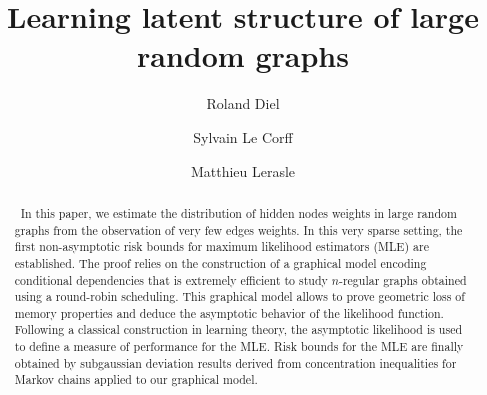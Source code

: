 


\title{Learning latent structure of large random graphs}
\date{}

\author{Roland Diel\footnotemark[1] \and Sylvain Le {C}orff\footnotemark[2] \and Matthieu Lerasle\footnotemark[2]}



\maketitle

\begin{abstract}
~In this paper, we estimate the distribution of hidden nodes weights in large random graphs from the observation of very few edges weights. In this very sparse setting, the first non-asymptotic risk bounds for maximum likelihood estimators (MLE) are established. The proof relies on the construction of a graphical model encoding conditional dependencies that is extremely efficient to study $n$-regular graphs obtained using a round-robin scheduling. This graphical model allows to prove geometric loss of memory properties and deduce the asymptotic behavior of the likelihood function. Following a classical construction in learning theory, the asymptotic likelihood is used to define a measure of performance for the MLE. Risk bounds for the MLE are finally obtained by subgaussian deviation results derived from concentration inequalities for Markov chains applied to our graphical model.
\end{abstract}


